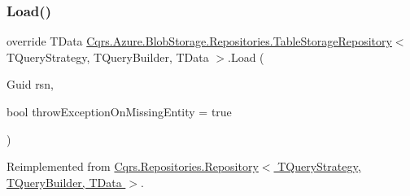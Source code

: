 \subsubsection{\texorpdfstring{Load()}{Load()}}
{\footnotesize\ttfamily override T\+Data \hyperlink{classCqrs_1_1Azure_1_1BlobStorage_1_1Repositories_1_1TableStorageRepository}{Cqrs.\+Azure.\+Blob\+Storage.\+Repositories.\+Table\+Storage\+Repository}$<$ T\+Query\+Strategy, T\+Query\+Builder, T\+Data $>$.Load (\begin{DoxyParamCaption}\item[{Guid}]{rsn,  }\item[{bool}]{throw\+Exception\+On\+Missing\+Entity = {\ttfamily true} }\end{DoxyParamCaption})\hspace{0.3cm}{\ttfamily [virtual]}}



Reimplemented from \hyperlink{classCqrs_1_1Repositories_1_1Repository_a444e9dfe4710be90940dbb6dec9d856f_a444e9dfe4710be90940dbb6dec9d856f}{Cqrs.\+Repositories.\+Repository$<$ T\+Query\+Strategy, T\+Query\+Builder, T\+Data $>$}.

